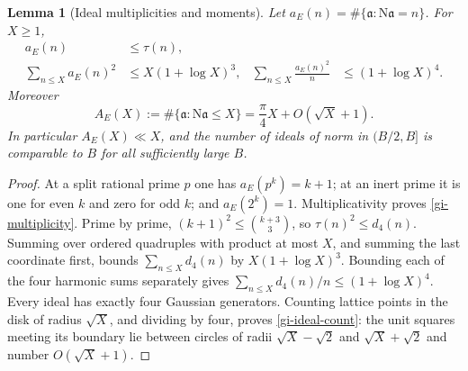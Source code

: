\documentclass[11pt]{article}
\newtheorem{lemma}[theorem]{Lemma}
\theoremstyle{definition}
\theoremstyle{remark}
\begin{document}
\begin{lemma}[Ideal multiplicities and moments]\label{gi-moments}
Let $a_E(n)=\#\{\mathfrak a:\mathrm N\mathfrak a=n\}$.  For $X\geq1$,
\begin{align}
 a_E(n)&\leq\tau(n),\label{gi-multiplicity}\\
 \sum_{n\leq X}a_E(n)^2&\leq X(1+\log X)^3,&
 \sum_{n\leq X}\frac{a_E(n)^2}{n}&\leq(1+\log X)^4.\label{gi-two-moments}
\end{align}
Moreover
\begin{equation}\label{gi-ideal-count}
 A_E(X):=\#\{\mathfrak a:\mathrm N\mathfrak a\leq X\}
       =\frac{\pi}{4}X+O(\sqrt X+1).
\end{equation}
In particular $A_E(X)\ll X$, and the number of ideals of norm in
$(B/2,B]$ is comparable to $B$ for all sufficiently large $B$.
\end{lemma}
\begin{proof}
At a split rational prime $p$ one has $a_E(p^k)=k+1$; at an inert prime
it is one for even $k$ and zero for odd $k$; and $a_E(2^k)=1$.
Multiplicativity proves \eqref{gi-multiplicity}.  Prime by prime,
$(k+1)^2\leq\binom{k+3}{3}$, so $\tau(n)^2\leq d_4(n)$.
Summing over ordered quadruples with product at most $X$, and summing
the last coordinate first, bounds $\sum_{n\leq X}d_4(n)$ by
$X(1+\log X)^3$.  Bounding each of the four harmonic sums separately
gives $\sum_{n\leq X}d_4(n)/n\leq(1+\log X)^4$.
Every ideal has exactly four Gaussian generators.  Counting lattice
points in the disk of radius $\sqrt X$, and dividing by four, proves
\eqref{gi-ideal-count}: the unit squares meeting its boundary lie
between circles of radii $\sqrt X-\sqrt2$ and $\sqrt X+\sqrt2$ and
number $O(\sqrt X+1)$.
\end{proof}
\end{document}
